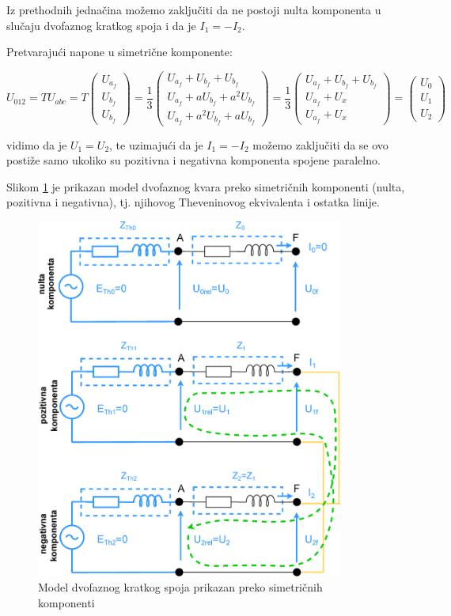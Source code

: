 Iz prethodnih jednačina možemo zaključiti da ne postoji nulta komponenta u slučaju dvofaznog kratkog spoja i da je $I_1=-I_2$.

Pretvarajući napone u simetrične komponente:

\[U_{012}=TU_{abc}=T \begin{pmatrix} U_{a_{f}} \\
U_{b_{f}} \\
U_{b_{f}} \end{pmatrix}=\frac{1}{3} \begin{pmatrix} U_{a_{f}}+U_{b_{f}}+U_{b_{f}} \\
U_{a_{f}}+aU_{b_{f}}+a^2U_{b_{f}} \\
U_{a_{f}}+a^2U_{b_{f}}+aU_{b_{f}} \end{pmatrix}=\frac{1}{3} \begin{pmatrix} U_{a_{f}}+U_{b_{f}}+U_{b_{f}} \\
U_{a_{f}}+U_x \\
U_{a_{f}}+U_x \end{pmatrix}=\begin{pmatrix} U_0 \\
U_1 \\
U_2 \end{pmatrix} \]

vidimo da je $U_1=U_2$, te uzimajući da je $I_1=-I_2$ možemo zaključiti da se ovo postiže samo ukoliko su pozitivna i negativna komponenta spojene paralelno. 

Slikom \ref{fig:shema4} je prikazan model dvofaznog kvara preko simetričnih komponenti (nulta, pozitivna i negativna), tj. njihovog Theveninovog ekvivalenta i ostatka linije.

\begin{figure}[H]
  \centering
  \includegraphics[width=0.9\textwidth]{shema4}
  \caption{Model dvofaznog kratkog spoja prikazan preko simetričnih komponenti}
  \label{fig:shema4}
\end{figure}

